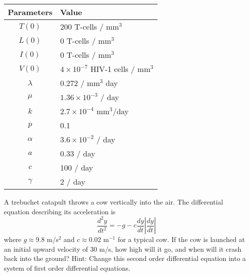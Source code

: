 \begin{problem}
\begin{center}
        \begin{tabular}{|c|l|}
            \hline
            Parameters & Value \\ \hline \hline
            $T(0)$ & 200 T-cells / mm$^3$ \\ \hline
            $L(0)$ & 0 T-cells / mm$^3$ \\ \hline
            $I(0)$ & 0 T-cells / mm$^3$ \\ \hline
            $V(0)$ & $4 \times 10^{-7}$ HIV-1 cells / mm$^3$ \\ \hline
            $\lambda$ & 0.272 / mm$^3$ day \\\hline
            $\mu$ & $1.36 \times 10^{-3}$ / day \\\hline
            $k$ & $2.7 \times 10^{-4}$ mm$^3$/day \\\hline
            $p$ & 0.1 \\\hline
            $\alpha$ & $3.6 \times 10^{-2}$ / day \\\hline
            $a$ & 0.33 / day \\\hline
            $c$ & 100 / day \\\hline
            $\gamma$ & 2 / day \\\hline
        \end{tabular}
    \end{center}
\end{problem}



\begin{problem}
    A trebuchet catapult throws a cow vertically into the air.  The differential equation
    describing its acceleration is
    \[ \frac{d^2y}{dt^2} = -g - c \frac{dy}{dt} \left| \frac{dy}{dt} \right| \]
    where $g \approx 9.8$ m/s$^2$ and $c \approx 0.02$ m$^{-1}$ for a typical cow.  If the
    cow is launched at an initial upward velocity of 30 m/s, how high will it go, and when
    will it crash back into the ground? Hint: Change this second order differential
    equation into a system of first order differential equations.
\end{problem}




